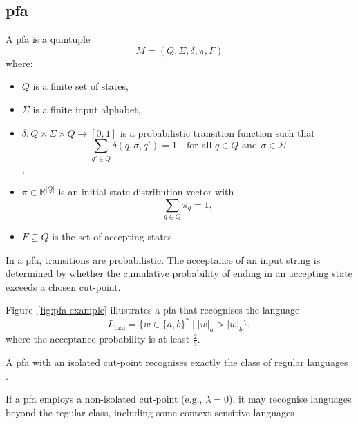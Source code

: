 \subsection{\acrfull{pfa}}
\label{subsec:pfa}

\begin{definition}
    A \gls{pfa} is a quintuple 
    \[
    M = (Q, \Sigma, \delta, \pi, F)
    \]
    where:
    \begin{itemize}
        \item \( Q \) is a finite set of states,
        \item \( \Sigma \) is a finite input alphabet,
        \item \( \delta: Q \times \Sigma \times Q \rightarrow [0,1] \) is a probabilistic transition function such that 
        \[
        \sum_{q' \in Q} \delta(q, \sigma, q') = 1 \quad \text{for all } q \in Q \text{ and } \sigma \in \Sigma
        \]\cite{rabin1963probabilistic},
        \item \( \pi \in \mathbb{R}^{|Q|} \) is an initial state distribution vector with 
        \[
        \sum_{q \in Q} \pi_q = 1,
        \]
        \item \( F \subseteq Q \) is the set of accepting states.
    \end{itemize}
\end{definition}

\begin{remark}
In a \gls{pfa}, transitions are probabilistic. The acceptance of an input string is determined by whether the cumulative probability of ending in an accepting state exceeds a chosen cut-point.
\end{remark}

\begin{example}
Figure~\ref{fig:pfa-example} illustrates a \gls{pfa} that recognises the language 
\[
L_{\text{maj}} = \{ w \in \{a,b\}^* \mid |w|_a > |w|_b \},
\]
where the acceptance probability is at least \( \frac{2}{3} \).
\end{example}

\begin{theorem}
    \label{thm:rabin}
    A \gls{pfa} with an isolated cut-point recognises exactly the class of regular languages \cite{rabin1963probabilistic}.
\end{theorem}

\begin{proposition}
    If a \gls{pfa} employs a non-isolated cut-point (e.g., \(\lambda = 0\)), it may recognise languages beyond the regular class, including some context-sensitive languages \cite{paz1971introduction}.
\end{proposition}

